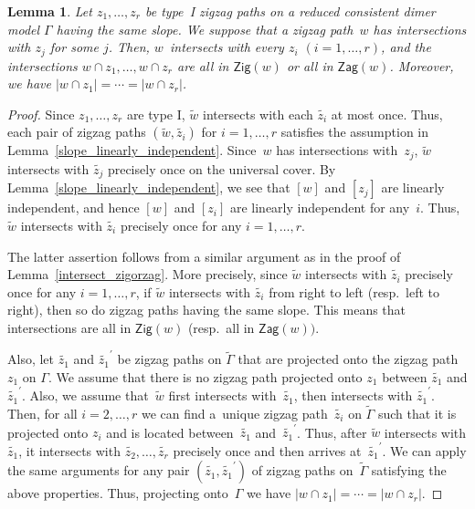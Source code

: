\documentclass[11pt]{article}
\numberwithin{equation}{section}
\numberwithin{equation}{section}
\numberwithin{figure}{section}
\numberwithin{table}{section}
\newtheorem{Lemma}[Theorem]{Lemma}
\newcommand{\Zig}{\mathsf{Zig}}
\newcommand{\Zag}{\mathsf{Zag}}
\begin{document}
\begin{Lemma}\label{intersect_zigorzag2}
Let $z_1,\dots,z_r$ be type~I zigzag paths on a reduced consistent dimer model $\Gamma$ having the same slope.
We suppose that a zigzag path~$w$ has intersections with $z_j$ for some $j$.
Then, $w$~intersects with every $z_i$ $(i=1,\dots,r)$, and the intersections $w\cap z_1,\dots, w\cap z_r$ are all in $\Zig(w)$ or all in $\Zag(w)$.
Moreover, we have $|w\cap z_1|=\cdots=|w\cap z_r|$.
\end{Lemma}

\begin{proof}
Since $z_1,\dots,z_r$ are type I, $\widetilde{w}$ intersects with each $\widetilde{z_i}$ at most once.
Thus, each pair of zigzag paths $(\widetilde{w},\widetilde{z_i})$ for $i=1,\dots,r$ satisfies the assumption in Lemma~\ref{slope_linearly_independent}.
Since~$w$ has intersections with~$z_j$, $\widetilde{w}$ intersects with $\widetilde{z_j}$ precisely once on the universal cover.
By Lemma~\ref{slope_linearly_independent}, we see that $[w]$ and $[z_j]$ are linearly independent, and hence $[w]$ and $[z_i]$ are linearly independent for any~$i$.
Thus, $\widetilde{w}$ intersects with $\widetilde{z_i}$ precisely once for any $i=1,\dots,r$.

The latter assertion follows from a similar argument as in the proof of Lemma~\ref{intersect_zigorzag}.
More precisely, since $\widetilde{w}$ intersects with $\widetilde{z_i}$ precisely once for any $i=1,\dots,r$,
if $\widetilde{w}$ intersects with $\widetilde{z_i}$ from right to left (resp.\ left to right), then so do zigzag paths having the same slope.
This means that intersections are all in $\Zig(w)$ (resp.\ all in $\Zag(w))$.

Also, let $\widetilde{z_1}$ and $\widetilde{z_1}^\prime$ be zigzag paths on $\widetilde{\Gamma}$ that are projected onto the zigzag path $z_1$ on $\Gamma$.
We assume that there is no zigzag path projected onto $z_1$ between $\widetilde{z_1}$ and $\widetilde{z_1}^\prime$.
Also, we assume that~$\widetilde{w}$ first intersects with~$\widetilde{z_1}$, then intersects with $\widetilde{z_1}^\prime$.
Then, for all $i=2,\dots,r$ we can find a~unique zigzag path~$\widetilde{z_i}$ on $\widetilde{\Gamma}$ such that it is projected onto $z_i$ and is located between~$\widetilde{z_1}$ and~$\widetilde{z_1}^\prime$.
Thus, after $\widetilde{w}$ intersects with $\widetilde{z_1}$, it intersects with $\widetilde{z_2}, \dots, \widetilde{z_r}$ precisely once and then arrives at~$\widetilde{z_1}^\prime$.
We can apply the same arguments for any pair $(\widetilde{z_1},\widetilde{z_1}^\prime)$ of zigzag paths on~$\widetilde{\Gamma}$ satisfying the above properties. Thus, projecting onto~$\Gamma$ we have $|w\cap z_1|=\cdots=|w\cap z_r|$.
\end{proof}
\end{document}
